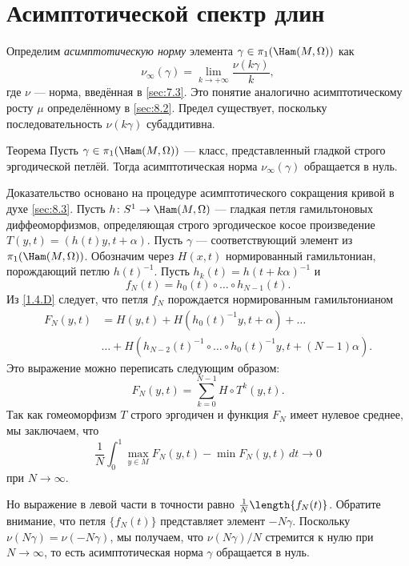 \section{Асимптотической спектр длин}\label{sec:11.2}

Определим \emph{асимптотическую норму} элемента
$\gamma\in\pi_1(\Ham(M, \Omega))$ как
\[\nu_\infty(\gamma)=\lim_{k\to+\infty}\frac{\nu(k\gamma)}{k},\]
где $\nu$ — норма, введённая в \ref{sec:7.3}. 
Это понятие аналогично асимптотическому росту $\mu$ определённому в
\ref{sec:8.2}.
Предел существует, поскольку последовательность $\nu(k\gamma)$ субаддитивна.

\begin{thm}{Теорема}\label{11.2.A}
Пусть $\gamma\in\pi_1(\Ham(M,\Omega))$ — класс, представленный
гладкой строго эргодической петлёй.
Тогда асимптотическая норма $\nu_\infty (\gamma)$ обращается в нуль.
\end{thm}

Доказательство основано на процедуре асимптотического сокращения
кривой в духе \ref{sec:8.3}. 
Пусть $h\: S^1 \to \Ham(M,\Omega)$ — гладкая петля гамильтоновых
диффеоморфизмов, определяющая строго эргодическое косое произведение
$T(y, t) = (h(t)y, t+\alpha)$. 
Пусть $\gamma$ — соответствующий элемент из $\pi_1(\Ham(M, \Omega))$.
Обозначим через $H(x, t)$ нормированный гамильтониан, порождающий
петлю $h(t)^{-1}$. 
Пусть $h_k(t) = h(t + k\alpha)^{-1}$ и  
\[f_N(t) = h_0(t) \circ \dots \circ h_{N-1}(t).\]
Из \ref{1.4.D} следует, что петля $f_N$ порождается нормированным гамильтонианом 
\begin{align*}
F_N(y,t)
&=
H(y,t)
+ H(h_0(t)^{-1}y,t+\alpha)
+\dots
\\
&\dots
+
H(h_{N-2} (t)^{-1} \circ \dots\circ h_0(t)^{-1}y, t + (N - 1)\alpha).
\end{align*}
Это выражение можно переписать следующим образом:
\[F_N(y, t) = \sum_{k=0}^{N-1} H\circ T^k(y, t).\]
Так как гомеоморфизм $T$ строго эргодичен и функция $F_N$ имеет
нулевое среднее, мы заключаем, что
\[\frac1N\int_0^1\max_{y\in M}F_N(y, t) - \min F_N(y, t)\,dt \to 0\]
при $N \to \infty$.

Но выражение в левой части в точности равно $\frac1N\length\{f_N(t)\}$.
Обратите внимание, что петля $\{f_N(t)\}$ представляет элемент $-N\gamma$.
Поскольку $\nu(N\gamma) = \nu(-N\gamma)$, мы получаем, что
$\nu(N\gamma)/N$ стремится к нулю при $N \to \infty$, 
то есть асимптотическая норма $\gamma$ обращается в нуль.
\qeds

